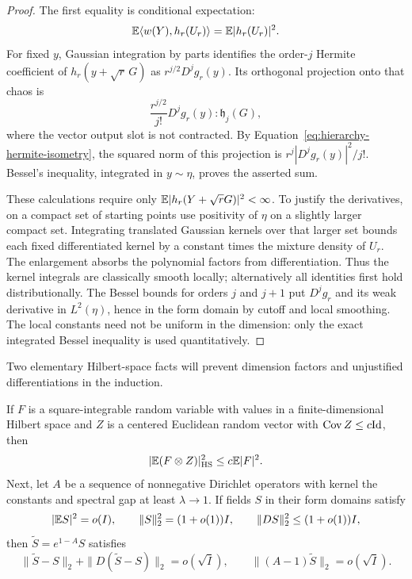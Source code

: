 \begin{proof}
The first equality is conditional expectation:
\[
 \mathbb E\langle w(Y),h_r(U_r)\rangle=\mathbb E|h_r(U_r)|^2.
\]
For fixed $y$, Gaussian integration by parts identifies the order-$j$
Hermite coefficient of $h_r(y+\sqrt r\,G)$ as
$r^{j/2}D^jg_r(y)$.  Its orthogonal projection onto that chaos is
\[
 \frac{r^{j/2}}{j!}D^jg_r(y):\mathfrak h_j(G),
\]
where the vector output slot is not contracted.  By
Equation~\eqref{eq:hierarchy-hermite-isometry}, the squared norm of this
projection is $r^j|D^jg_r(y)|^2/j!$.  Bessel's inequality, integrated in
$y\sim\eta$, proves the asserted sum.

These calculations require only
$\mathbb E|h_r(Y+\sqrt rG)|^2<\infty$.  To justify the derivatives, on a compact
set of starting points use positivity of $\eta$ on a slightly larger
compact set.  Integrating translated Gaussian kernels over that larger
set bounds each fixed differentiated kernel by a constant times the
mixture density of $U_r$.  The enlargement absorbs the polynomial factors
from differentiation.  Thus the kernel integrals are classically smooth
locally; alternatively all identities first hold distributionally.  The
Bessel bounds for orders $j$ and $j+1$ put $D^jg_r$ and its weak derivative
in $L^2(\eta)$, hence in the form domain by cutoff and local smoothing.
The local constants need not be uniform in the dimension: only the exact
integrated Bessel inequality is used quantitatively.
\end{proof}

Two elementary Hilbert-space facts will prevent dimension factors and
unjustified differentiations in the induction.

\begin{lemma}
\label{lem:hierarchy-smoothing}
If $F$ is a square-integrable random variable with values in a
finite-dimensional Hilbert space and $Z$ is a
centered Euclidean random vector with $\operatorname{Cov} Z\le c\mathrm{Id}$, then
\begin{equation}\label{eq:hierarchy-crosscov}
 |\mathbb E(F\otimes Z)|_{\mathrm{HS}}^2\le c\mathbb E|F|^2.
\end{equation}
Next, let $A$ be a sequence of nonnegative Dirichlet operators with kernel
the constants and spectral gap at least $\lambda\to1$.  If fields $S$ in
their form domains satisfy
\[
 |\mathbb E S|^2=o(I),\qquad \|S\|_2^2=(1+o(1))I,\qquad
 \|DS\|_2^2\le(1+o(1))I,
\]
then $\widetilde S=e^{1-A}S$ satisfies
\begin{equation}\label{eq:hierarchy-smoothing}
 \|\widetilde S-S\|_2+\|D(\widetilde S-S)\|_2=o(\sqrt I),
 \qquad \|(A-1)\widetilde S\|_2=o(\sqrt I).
\end{equation}
\end{lemma}

